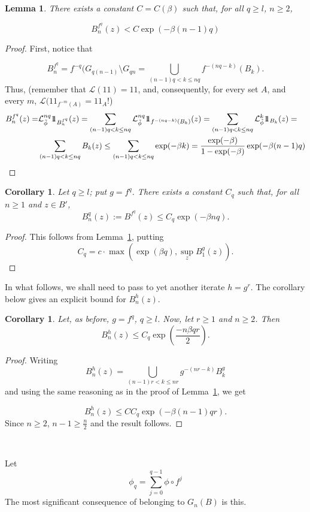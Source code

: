 \documentclass[12pt]{amsart}
\numberwithin{equation}{section}
\newtheorem{lem}[thm]{Lemma}
\newtheorem{cor}[thm]{Corollary}
\def\1{1\!\!1}
\def\L{{\mathcal L}}           \def\M{\mathcal M}        \def\Pa{{\mathcal P}}
\begin{document}
\begin{lem}\label{q} There exists a constant $C=C(\beta)$ such that, for all $q\ge l$, $n\ge 2$, 

$$B^{f^q}_n(z)<C\exp(-\beta(n-1)q)$$
\end{lem}
\begin{proof}
First, notice that 

$$B^{f^q}_n=f^{-q}(G_{q(n-1)}\setminus G_{qn}=\bigcup _{(n-1)q<k\le nq}f^{-(nq-k)}(B_k).$$
Thus, (remember that $\mathcal{\L}(\1)=\1$, and, consequently, for every set $A$, and every $m$,  $\mathcal{\L}(\1_{f^{-m}(A)}=\1_{A}$!)
$$
\aligned
B_n^{f^q}(z)=&\mathcal{L}^{nq}_{\tilde\phi}\1_{B^{f^q}_n}(z)=
\sum _{(n-1)q<k\le nq}\mathcal{L}^{nq}_{\tilde\phi}\1_{f^{-(nq-k)}(B_k)}(z)=
\sum_{(n-1)q<k\le nq}\mathcal{L}^k_{\tilde\phi}\1_{B_k}(z)=\\
&\sum_{(n-1)q<k\le nq}B_k(z)\le \sum_{(n-1)q<k\le nq}\exp(-\beta k)=\frac{\exp(-\beta)}{1-\exp(-\beta)}\exp(-\beta(n-1)q)
\endaligned
$$
\end{proof}
\begin{cor}
Let $q\ge l$; put $g=f^q$. There exists a constant $C_q$ such that, for all $n\ge 1$ and $z\in B'$, 
$$B^q_n(z):=B^{f^q}(z)\le C_q\exp(-\beta nq).$$
\end{cor}
\begin{proof}
This follows from Lemma~\ref{q}, putting 
$$C_q=c\cdot \max(\exp(\beta q),\sup_zB^g_1(z)).$$
\end{proof}
In what follows, we shall need to pass to yet another iterate $h=g^r$. The corollary below gives an explicit bound for $B^h_n(z)$.

\begin{cor}
Let, as before, $g=f^q$, $q\ge l$.
Now, let $r\ge 1$ and $n\ge 2$.
Then
$$B^h_n(z)\le C_q\exp(\frac{-n\beta qr}{2}).$$
\end{cor}

\begin{proof}
Writing 
$$B^h_n(z)=\bigcup_{(n-1)r<k\le nr}g^{-(nr-k)}B^g_k$$
and using the same reasoning as in the proof of Lemma~\ref{q}, we get

$$B^h_n(z)\le C C_q\exp(-\beta(n-1)qr).$$
Since $n\ge 2$, $n-1\ge \frac{n}{2}$ and the result follows.

\end{proof}

 
\

\fr Let 
$$
\phi_q=\sum_{j=0}^{q-1}\phi\circ f^j
$$
The most significant consequence of belonging to $G_n(B)$ is this.
\end{document}
